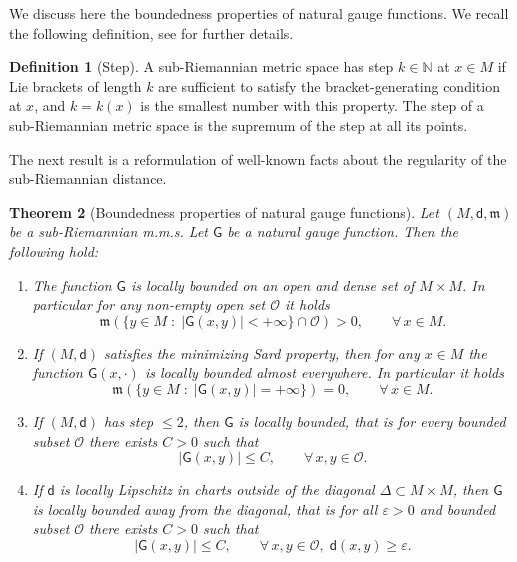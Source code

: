 \documentclass[11pt,a4paper]{article}
\theoremstyle{plain}
\newtheorem{theorem}{Theorem}[section]
\theoremstyle{definition}
\newtheorem{definition}[theorem]{Definition}
\theoremstyle{remark}
\numberwithin{equation}{section}
\newcommand{\N}{\mathbb{N}} %
\newcommand{\mm}{\mathfrak m}
\newcommand{\sfd}{\mathsf d}
\newcommand{\sfG}{\mathsf G}
\begin{document}
We discuss here the boundedness properties of natural gauge functions. We recall the following definition, see \cite[Sec.\ 3.1]{nostrolibro} for further details.

\begin{definition}[Step]\label{def:step}
A sub-Riemannian metric space has step $k\in \N$ at $x\in M$ if Lie brackets of length $k$ are sufficient to satisfy the bracket-generating condition at $x$, and $k=k(x)$ is the smallest number with this property. The step of a sub-Riemannian metric space is the supremum of the step at all its points.
\end{definition}

The next result is a reformulation of well-known facts about the regularity of the sub-Riemannian distance.

\begin{theorem}[Boundedness properties of natural gauge functions]\label{t:boundedness}
Let $(M,\sfd,\mm)$ be a sub-Riemannian m.m.s. Let $\sfG$ be a natural gauge function. Then the following hold:
\begin{enumerate}[label = (\roman*)]
\item \label{i:boundedness1} The function $\sfG$ is locally bounded on an open and dense set of $M\times M$. In particular for any non-empty open set $\mathcal{O}$ it holds
\begin{equation}
\mm(\{y\in M \; : \; |\sfG(x,y)|<+\infty\}\cap \mathcal{O}) >0, \qquad \forall\, x \in M.
\end{equation}
\item \label{i:boundedness2} If $(M,\sfd)$ satisfies the minimizing Sard property, then for any $x\in M$ the function $\sfG(x,\cdot)$ is locally bounded almost everywhere. In particular it holds
\begin{equation}
\mm(\{y\in M  \; : \; |\sfG(x,y)| = +\infty\}) = 0, \qquad \forall\, x\in M.
\end{equation}
\item \label{i:boundedness3} If $(M,\sfd)$ has step $\leq 2$, then $\sfG$ is locally bounded, that is for every bounded subset $\mathcal{O}$ there exists $C>0$ such that
\begin{equation}
|\sfG(x,y)| \leq C,\qquad \forall\, x,y\in \mathcal{O}.
\end{equation}

\item \label{i:boundedness4} If $\sfd$ is locally Lipschitz in charts outside of the diagonal $\Delta\subset M\times M$, then $\sfG$ is locally bounded away from the diagonal, that is for all $\varepsilon>0$ and bounded subset $\mathcal{O}$ there exists $C>0$ such that 
\begin{equation}
|\sfG(x,y)| \leq C,\qquad \forall\, x,y\in \mathcal{O},\; \sfd(x,y)\geq \varepsilon.
\end{equation}
\end{enumerate}
\end{theorem}
\end{document}
